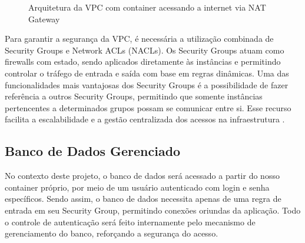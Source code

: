 \begin{figure}[H]
\centering
\caption{Arquitetura da VPC com container acessando a internet via NAT Gateway}
\label{fig:vpc-simples}
\end{figure}


Para garantir a segurança da VPC, é necessária a utilização combinada de Security Groups e Network ACLs (NACLs). Os Security Groups atuam como firewalls com estado, sendo aplicados diretamente às instâncias e permitindo controlar o tráfego de entrada e saída com base em regras dinâmicas. Uma das funcionalidades mais vantajosas dos Security Groups é a possibilidade de fazer referência a outros Security Groups, permitindo que somente instâncias pertencentes a determinados grupos possam se comunicar entre si. Esse recurso facilita a escalabilidade e a gestão centralizada dos acessos na infraestrutura \cite{aws2024securitygroups}.

\subsection{Banco de Dados Gerenciado}\label{sec:metod-rds}
No contexto deste projeto, o banco de dados será acessado a partir do nosso container próprio, por meio de um usuário autenticado com login e senha específicos. Sendo assim, o banco de dados necessita apenas de uma regra de entrada em seu Security Group, permitindo conexões oriundas da aplicação. Todo o controle de autenticação será feito internamente pelo mecanismo de gerenciamento do banco, reforçando a segurança do acesso.

